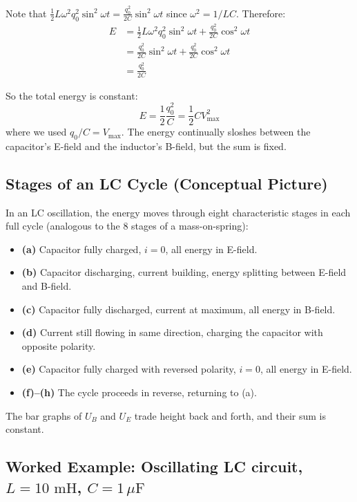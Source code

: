 \documentclass[11pt]{report}
\begin{document}
Note that $\tfrac{1}{2}L\omega^2 q_0^2 \sin^2\omega t = \frac{q_0^2}{2C}\sin^2\omega t$ since $\omega^2 = 1/LC$. Therefore:
\begin{align}
E &= \tfrac{1}{2}L\omega^2 q_0^2\sin^2\omega t + \frac{q_0^2}{2C}\cos^2\omega t \\
  &= \frac{q_0^2}{2C}\sin^2\omega t + \frac{q_0^2}{2C}\cos^2\omega t \\
  &= \frac{q_0^2}{2C}
\end{align}

So the total energy is constant:
\begin{equation}
\boxed{E = \frac{1}{2}\frac{q_0^2}{C} = \frac{1}{2}CV_{\max}^2}
\end{equation}
where we used $q_0/C = V_{\max}$. The energy continually sloshes between the capacitor's E-field and the inductor's B-field, but the sum is fixed.

\subsection*{Stages of an LC Cycle (Conceptual Picture)}

In an LC oscillation, the energy moves through eight characteristic stages in each full cycle (analogous to the 8 stages of a mass-on-spring):
\begin{itemize}[leftmargin=*]
    \item \textbf{(a)} Capacitor fully charged, $i = 0$, all energy in E-field.
    \item \textbf{(b)} Capacitor discharging, current building, energy splitting between E-field and B-field.
    \item \textbf{(c)} Capacitor fully discharged, current at maximum, all energy in B-field.
    \item \textbf{(d)} Current still flowing in same direction, charging the capacitor with opposite polarity.
    \item \textbf{(e)} Capacitor fully charged with reversed polarity, $i = 0$, all energy in E-field.
    \item \textbf{(f)--(h)} The cycle proceeds in reverse, returning to (a).
\end{itemize}
The bar graphs of $U_B$ and $U_E$ trade height back and forth, and their sum is constant.

\subsection{Worked Example: Oscillating LC circuit, $L = 10\text{ mH}$, $C = 1\,\mu\text{F}$}
\end{document}
